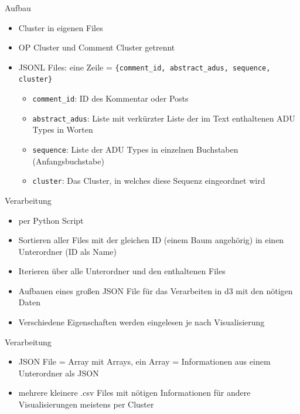 \documentclass[compress,12pt]{beamer}
\begin{document}
    \begin{frame}{Aufbau}
        \begin{itemize}
            \item Cluster in eigenen Files
            \item OP Cluster und Comment Cluster getrennt
            \item JSONL Files: eine Zeile = \texttt{\{comment\_id, abstract\_adus, sequence, cluster\}}
            \begin{itemize}
                \item \texttt{comment\_id}: ID des Kommentar oder Posts
                \item \texttt{abstract\_adus}: Liste mit verkürzter Liste der im Text enthaltenen ADU Types in Worten
                \item \texttt{sequence}: Liste der ADU Types in einzelnen Buchstaben (Anfangsbuchstabe)
                \item \texttt{cluster}: Das Cluster, in welches diese Sequenz eingeordnet wird
            \end{itemize}
        \end{itemize}
    \end{frame}

    \begin{frame}{Verarbeitung}
        \begin{itemize}
            \item per Python Script
            \item Sortieren aller Files mit der gleichen ID (einem Baum angehörig) in einen Unterordner (ID als Name)
            \item Iterieren über alle Unterordner und den enthaltenen Files
            \item Aufbauen eines großen JSON File für das Verarbeiten in d3 mit den nötigen Daten
            \item Verschiedene Eigenschaften werden eingelesen je nach Visualisierung
        \end{itemize}
    \end{frame}

    \begin{frame}{Verarbeitung}
        \begin{itemize}
            \item JSON File = Array mit Arrays, ein Array = Informationen aus einem Unterordner als JSON
            \item mehrere kleinere .csv Files mit nötigen Informationen für andere Visualisierungen \textrightarrow meistens per Cluster
        \end{itemize}
    \end{frame}
\end{document}
